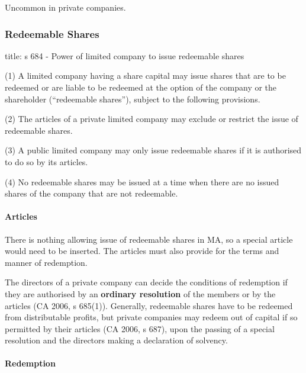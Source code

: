 \documentclass[
]{article}
\newenvironment{Shaded}{}{}
\newcommand{\NormalTok}[1]{#1}
\begin{document}
Uncommon in private companies.

\hypertarget{redeemable-shares-1}{%
\subsubsection{Redeemable Shares}\label{redeemable-shares-1}}

\begin{Shaded}
\begin{Highlighting}[]
\NormalTok{title: s 684 {-} Power of limited company to issue redeemable shares}

\NormalTok{(1) A limited company having a share capital may issue shares that are to be redeemed or are liable to be redeemed at the option of the company or the shareholder (“redeemable shares”), subject to the following provisions.}

\NormalTok{(2) The articles of a private limited company may exclude or restrict the issue of redeemable shares.}

\NormalTok{(3) A public limited company may only issue redeemable shares if it is authorised to do so by its articles.}

\NormalTok{(4) No redeemable shares may be issued at a time when there are no issued shares of the company that are not redeemable.}
\end{Highlighting}
\end{Shaded}

\hypertarget{articles}{%
\paragraph{Articles}\label{articles}}

There is nothing allowing issue of redeemable shares in MA, so a special
article would need to be inserted. The articles must also provide for
the terms and manner of redemption.

The directors of a private company can decide the conditions of
redemption if they are authorised by an \textbf{ordinary resolution} of
the members or by the articles (CA 2006, s 685(1)). Generally,
redeemable shares have to be redeemed from distributable profits, but
private companies may redeem out of capital if so permitted by their
articles (CA 2006, s 687), upon the passing of a special resolution and
the directors making a declaration of solvency.

\hypertarget{redemption}{%
\paragraph{Redemption}\label{redemption}}
\end{document}

